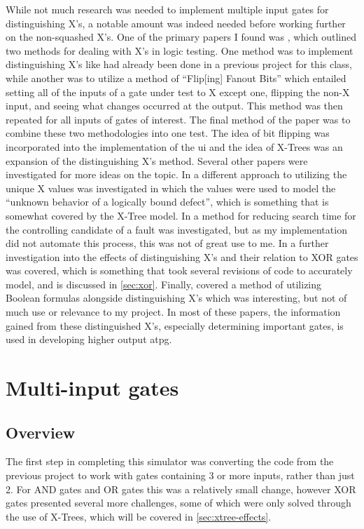 \documentclass[12pt]{report}
\begin{document}
While not much research was needed to implement multiple input gates for distinguishing X's, a notable amount was indeed needed before working further on the non-squashed X's. One of the primary papers I found was \cite{efficient-error}, which outlined two methods for dealing with X's in logic testing. One method was to implement distinguishing X's like had already been done in a previous project for this class, while another was to utilize a method of ``Flip[ing] Fanout Bits'' which entailed setting all of the inputs of a gate under test to X except one, flipping the non-X input, and seeing what changes occurred at the output. This method was then repeated for all inputs of gates of interest. The final method of the paper was to combine these two methodologies  into one test. The idea of bit flipping was incorporated into the implementation of the \ac{ui} and the idea of X-Trees was an expansion of the distinguishing X's method. Several other papers were investigated for more ideas on the topic. In \cite{multiple-defect} a different approach to utilizing the unique X values was investigated in which the values were used to model the ``unknown behavior of a logically bound defect'', which is something that is somewhat covered by the X-Tree model. In \cite{incremental} a method for reducing search time for the controlling candidate of a fault was investigated, but as my implementation did not automate this process, this was not of great use to me. In \cite{exclusive-test} a further investigation into the effects of distinguishing X's and their relation to XOR gates was covered, which is something that took several revisions of code to accurately model, and is discussed in \cref{sec:xor}. Finally, \cite{modeling-unknown} covered a method of utilizing Boolean formulas alongside distinguishing X's which was interesting, but not of much use or relevance to my project. In most of these papers, the information gained from these distinguished X's, especially determining important gates, is used in developing higher output \ac{atpg}.

\singlespacing
\chapter{Multi-input gates}\label{sec:mig}
\doublespacing

\section{Overview}

The first step in completing this simulator was converting the code from the previous project to work with gates containing 3 or more inputs, rather than just 2. For AND gates and OR gates this was a relatively small change, however XOR gates presented several more challenges, some of which were only solved through the use of X-Trees, which will be covered in \cref{sec:xtree-effects}.
\end{document}
